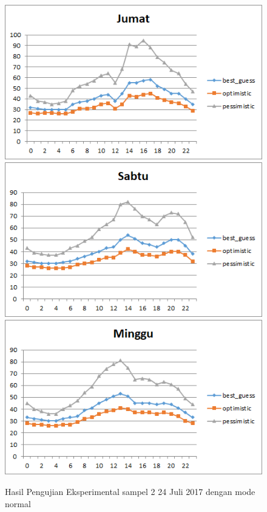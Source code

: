 \begin{figure}[H]
				\centering		
				\includegraphics[]{Gambar/jumatsampel224072017normal.png}
				\includegraphics[]{Gambar/sabtusampel224072017normal.png}
				\includegraphics[]{Gambar/minggusampel224072017normal.png}
				\caption[Hasil Pengujian Eksperimental]{Hasil Pengujian Eksperimental sampel 2 24 Juli 2017 dengan mode normal}
				\label{fig:eksperimentalsampel224072017normal}
\end{figure}

